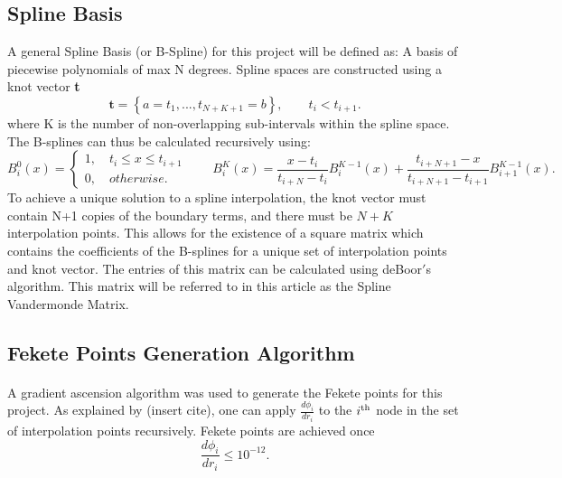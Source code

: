 \documentclass{article}
\begin{document}
\subsection{Spline Basis}
A general Spline Basis (or B-Spline) for this project will be defined as: A basis of piecewise polynomials of max N degrees. Spline spaces are constructed using a knot vector \textbf{t}
\begin{equation*}
\textbf{t}=\left\{a=t_1,...,t_{N+K+1}=b\right\},\qquad t_i<t_{i+1}.
\end{equation*}
where K is the number of non-overlapping sub-intervals within the spline space. The B-splines can thus be calculated recursively using:
\begin{equation*}
B^0_i(x)=\begin{cases}
1,\quad t_i\leq x\leq t_{i+1}\\
0,\quad otherwise.
\end{cases}
\qquad
B^K_i(x)=\frac{x-t_i}{t_{i+N}-t_i}B^{K-1}_i(x)+\frac{t_{i+N+1}-x}{t_{i+N+1}-t_{i+1}}B^{K-1}_{i+1}(x).
\end{equation*}
To achieve a unique solution to a spline interpolation, the knot vector must contain N+1 copies of the boundary terms, and there must be $N+K$ interpolation points. This allows for the existence of a square matrix which contains the coefficients of the B-splines for a unique set of interpolation points and knot vector. The entries of this matrix can be calculated using deBoor$'$s algorithm. This matrix will be referred to in this article as the Spline Vandermonde Matrix.

\subsection{Fekete Points Generation Algorithm}
\paragraph{}
A gradient ascension algorithm was used to generate the Fekete points for this project. As explained by (insert cite), one can apply $\frac{d\phi_i}{dr_i}$ to the $i\textsuperscript{th}$ node in the set of interpolation points recursively. Fekete points are achieved once 
\begin{equation*}\frac{d\phi_i}{dr_i}\leq 10^{-12}.\end{equation*}
\end{document}
